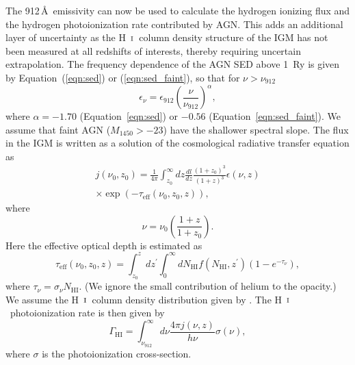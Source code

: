 \documentclass[fleqn,usenatbib]{mnras}
\def\HI{\hbox{H~$\scriptstyle\rm I$}}
\begin{document}
The 912\,\AA\ emissivity can now be used to calculate the hydrogen
ionizing flux and the hydrogen photoionization rate contributed by
AGN.  This adds an additional layer of uncertainty as the \HI\ column
density structure of the IGM has not been measured at all redshifts of
interests, thereby requiring uncertain extrapolation.  The frequency
dependence of the AGN SED above 1~Ry is given by
Equation~(\ref{eqn:sed}) or (\ref{eqn:sed_faint}), so that for $\nu >
\nu_{912}$
\begin{equation}
  \epsilon_\nu = \epsilon_{912}\left(\frac{\nu}{\nu_{912}}\right)^\alpha,
  \label{eqn:epsilon_freq}
\end{equation}
where $\alpha=-1.70$ (Equation~\ref{eqn:sed}) or $-0.56$
(Equation~\ref{eqn:sed_faint}).  We assume that faint AGN
($M_{1450}>-23$) have the shallower spectral slope.  The flux in the
IGM is written as a solution of the cosmological radiative transfer
equation as \citep{2012ApJ...746..125H}
\begin{multline}
  j(\nu_0, z_0)=\frac{1}{4\pi}\int_{z_0}^\infty dz\frac{dl}{dz}
  \frac{(1+z_0)^3}{(1+z)^3}\epsilon(\nu,z)\\
  \times\exp{(-\tau_\mathrm{eff}(\nu_0, z_0, z))},
  \label{eqn:flux}
\end{multline}
where
\begin{equation}
  \nu = \nu_0\left(\frac{1+z}{1+z_0}\right).
\end{equation}
Here the effective optical depth is estimated as
\begin{equation}
  \tau_\mathrm{eff}(\nu_0, z_0, z) = \int_{z_0}^z dz^\prime\int_0^\infty
  dN_\mathrm{HI} f(N_\mathrm{HI}, z^\prime) (1-e^{-\tau_\nu}),
\end{equation}
where $\tau_\nu=\sigma_\nu N_\mathrm{HI}$.  (We ignore the small
contribution of helium to the opacity.)  We assume the \HI\ column
density distribution given by \citet{2012ApJ...746..125H}.
The
\HI\ photoionization rate is then given by
\begin{equation}
  \Gamma_\mathrm{HI}=\int_{\nu_{912}}^\infty d\nu
  \frac{4\pi j(\nu,z)}{h\nu} \sigma(\nu),
\end{equation}
where $\sigma$ is the photoionization cross-section.
\end{document}
